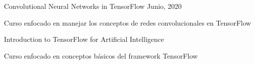 \begin{cventries}
  \cventry
  {Convolutional Neural Networks in TensorFlow} %
  {} %
  {} %
  {Junio, 2020} %
  {
    \begin{cvitems} %
      \item {Curso enfocado en manejar los conceptos de redes convolucionales en TensorFlow}
    \end{cvitems}
  }

  \cventry
  {Introduction to TensorFlow for Artificial Intelligence} %
  {} %
  {} %
  {} %
  {
    \begin{cvitems} %
      \item {Curso enfocado en conceptos básicos del framework TensorFlow}
    \end{cvitems}
  }

\end{cventries}